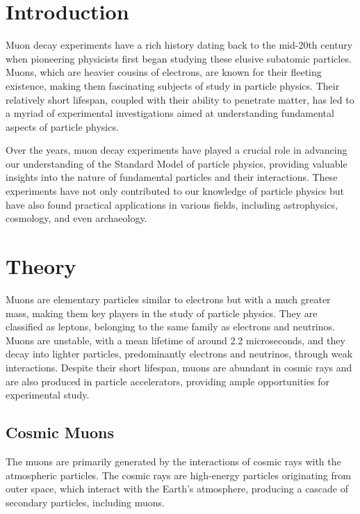 \documentclass{article}
\begin{document}
\begin{multicols}{2}






\section{\label{intro}Introduction}
Muon decay experiments have a rich history dating back to the mid-20th century when pioneering physicists first began studying these elusive subatomic particles. Muons, which are heavier cousins of electrons, are known for their fleeting existence, making them fascinating subjects of study in particle physics. Their relatively short lifespan, coupled with their ability to penetrate matter, has led to a myriad of experimental investigations aimed at understanding fundamental aspects of particle physics.

Over the years, muon decay experiments have played a crucial role in advancing our understanding of the Standard Model of particle physics, providing valuable insights into the nature of fundamental particles and their interactions. These experiments have not only contributed to our knowledge of particle physics but have also found practical applications in various fields, including astrophysics, cosmology, and even archaeology.
\section{\label{theory}Theory}
Muons are elementary particles similar to electrons but with a much greater mass, making them key players in the study of particle physics. They are classified as leptons, belonging to the same family as electrons and neutrinos. Muons are unstable, with a mean lifetime of around 2.2 microseconds, and they decay into lighter particles, predominantly electrons and neutrinos, through weak interactions. Despite their short lifespan, muons are abundant in cosmic rays and are also produced in particle accelerators, providing ample opportunities for experimental study. 

\subsection{Cosmic Muons}
The muons are primarily generated by the interactions of cosmic rays with the atmospheric particles. The cosmic rays are high-energy particles originating from outer space, which interact with the Earth's atmosphere, producing a cascade of secondary particles, including muons. 


\end{multicols}
\end{document}
